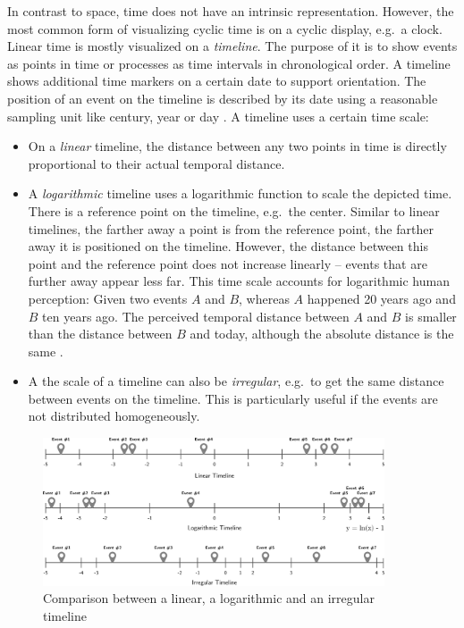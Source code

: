 In contrast to space, time does not have an intrinsic representation. However, the most common form of visualizing cyclic time is on a cyclic display, e.g.\ a  clock. Linear time is mostly visualized on a \emph{timeline}. The purpose of it is to show events as points in time or processes as time intervals in chronological order. A timeline shows additional time markers on a certain date to support orientation. The position of an event on the timeline is described by its date using a reasonable sampling unit like century, year or day
\cite[p. 32]{Langran1989timeingis}.
A timeline uses a certain time scale:

\begin{itemize}
  \item On a \emph{linear} timeline, the distance between any two points in time is directly proportional to their actual temporal distance.
  \item A \emph{logarithmic} timeline uses a logarithmic function to scale the depicted time. There is a reference point on the timeline, e.g.\ the center. Similar to linear timelines, the farther away a point is from the reference point, the farther away it is positioned on the timeline. However, the distance between this point and the reference point does not increase linearly -- events that are further away appear less far. This time scale accounts for logarithmic human perception: Given two events $A$ and $B$, whereas $A$ happened 20 years ago and $B$ ten years ago. The perceived temporal distance between $A$ and $B$ is smaller than the distance between $B$ and today, although the absolute distance is the same
  \cite{logorlinear}.
  \item A the scale of a timeline can also be \emph{irregular}, e.g.\ to get the same distance between events on the timeline. This is particularly useful if the events are not distributed homogeneously.
\end{itemize}

\begin{figure}[ht]
  \centering
  \includegraphics[width=0.9\textwidth]{graphics/basics/hgis/timelines}
  \caption{Comparison between a linear, a logarithmic and an irregular timeline}
  \label{fig:timelines}
\end{figure}

